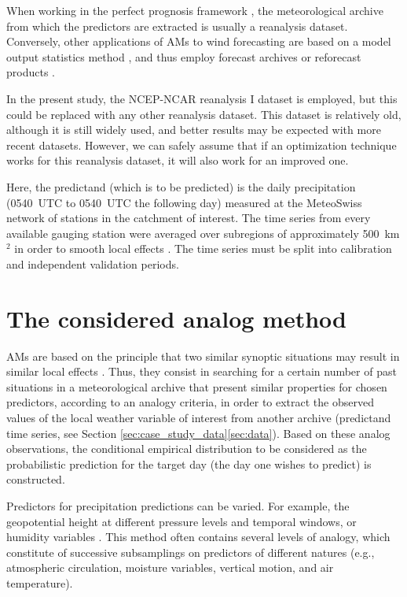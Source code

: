 \documentclass{ametsoc}
\begin{document}
When working in the perfect prognosis framework \citep{Klein1963}, the meteorological archive from which the predictors are extracted is usually a reanalysis dataset. Conversely, other applications of AMs to wind forecasting are based on a model output statistics method \citep[MOS, see][]{Glahn1972}, and thus employ forecast archives or reforecast products \citep[e.g.,][]{DelleMonache2013, DelleMonache2011, Alessandrini2015, Junk2015, Junk2015c}.

In the present study, the NCEP-NCAR reanalysis I dataset \citep[six-hourly, 17 pressure levels at a resolution of 2.5\degree, see][]{Kalnay1996} is employed, but this could be replaced with any other reanalysis dataset. This dataset is relatively old, although it is still widely used, and better results may be expected with more recent datasets. However, we can safely assume that if an optimization technique works for this reanalysis dataset, it will also work for an improved one.

Here, the predictand (which is to be predicted) is the daily precipitation (0540~UTC to 0540~UTC the following day) measured at the MeteoSwiss network of stations in the catchment of interest. The time series from every available gauging station were averaged over subregions of approximately 500~km$^{2}$ \citep[see][for details]{Horton2012a} in order to smooth local effects \citep{Obled2002, Marty2012}. The time series must be split into calibration and independent validation periods.


\section{The considered analog method}
\label{sec:am}

AMs are based on the principle that two similar synoptic situations may result in similar local effects \citep{Lorenz1956, Lorenz1969}. Thus, they consist in searching for a certain number of past situations in a meteorological archive that present similar properties for chosen predictors, according to an analogy criteria, in order to extract the observed values of the local weather variable of interest from another archive (predictand time series, see Section \ref{sec:case_study_data}\ref{sec:data}). Based on these analog observations, the conditional empirical distribution to be considered as the probabilistic prediction for the target day (the day one wishes to predict) is constructed.

Predictors for precipitation predictions can be varied. For example, the geopotential height at different pressure levels and temporal windows, or humidity variables \citep[see][for a more detailed list of predictors]{BenDaoud2016}. This method often contains several levels of analogy, which constitute of successive subsamplings on predictors of different natures (e.g., atmospheric circulation, moisture variables, vertical motion, and air temperature). 
\end{document}
